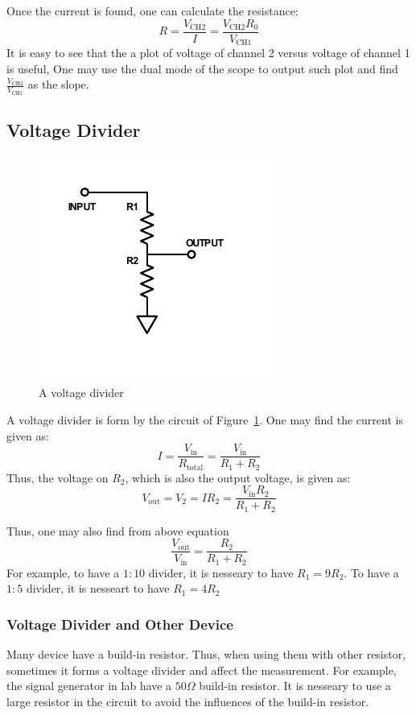 \documentclass[aps,prl,reprint]{revtex4-1}
\begin{document}
    Once the current is found, one can calculate the resistance:
    \[
    R = \frac{V_\text{CH2}}{I} = \frac{V_\text{CH2}R_0}{V_\text{CH1}}
    \]
    It is easy to see that the a plot of voltage of channel 2 versus voltage of channel 1 is useful, One may use the dual mode of the scope to output such plot and find $\frac{V_\text{CH2}}{V_\text{CH1}}$ as the slope.
    \subsection{Voltage Divider}
    \begin{figure}[h]
        \centering
        \includegraphics{images/plot2.pdf}
        \caption{A voltage divider}
        \label{fig:2}
    \end{figure}
    A voltage divider is form by the circuit of Figure~\ref{fig:2}. One may find the current is given as:
    \[{}
    I = \frac{V_\text{in}}{R_\text{total}} = \frac{V_\text{in}}{R_1 + R_2}
    \]
    Thus, the voltage on $R_2$, which is also the output voltage, is given as:
    \[
    V_\text{out} = V_2 = IR_2 = \frac{V_\text{in} R_2}{R_1 + R_2}
    \]

    Thus, one may also find from above equation
    \[
    \frac{V_\text{out}}{V_\text{in}} = \frac{R_2}{R_1 + R_2}
    \]
    For example, to have a $1:10$ divider, it is nesseary to have $R_1 = 9R_2$. To have a $1:5$ divider, it is nesseart to have $R_1 = 4R_2$
        \subsubsection{Voltage Divider and Other Device}
        Many device have a build-in resistor. Thus, when using them with other resistor, sometimes it forms a voltage divider and affect the measurement. For example, the signal generator in lab have a $50\Omega$ build-in resistor. It is nesseary to use a large resistor in the circuit to avoid the influences of the build-in resistor.
\end{document}
